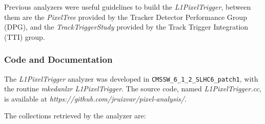 \documentclass[a4paper,12pt,oneside]{article}
\begin{document}
Previous analyzers were useful guidelines to build the \textit{L1PixelTrigger}, between them are the \textit{PixelTree} provided by the Tracker Detector Performance Group (DPG), and the \textit{TrackTriggerStudy} provided by the Track Trigger Integration (TTI) group. 

                   \subsubsection{Code and Documentation}


                   The \textit{L1PixelTrigger} analyzer was developed in \texttt{CMSSW\_6\_1\_2\_SLHC6\_patch1}, with the routine {\it mkedanlzr L1PixelTrigger}. The source code, named {\it L1PixelTrigger.cc}, is available at 
{\it https://github.com/jruizvar/pixel-analysis/}. 

The collections retrieved by the analyzer are:
\end{document}
